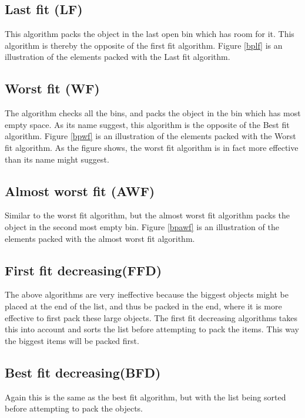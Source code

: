 \subsection{Last fit (LF)}
This algorithm packs the object in the last open bin which has room for it. This algorithm is thereby the opposite of the first fit algorithm. Figure \ref{bplf} is an illustration of the elements packed with the Last fit algorithm.


\subsection{Worst fit (WF)}
The algorithm checks all the bins, and packs the object in the bin which has most empty space. As its name suggest, this algorithm is the opposite of the Best fit algorithm. Figure \ref{bpwf} is an illustration of the elements packed with the Worst fit algorithm. As the figure shows, the worst fit algorithm is in fact more effective than its name might suggest. 

\subsection{Almost worst fit (AWF)}
Similar to the worst fit algorithm, but the almost worst fit algorithm packs the object in the second most empty bin.  Figure \ref{bpawf} is an illustration of the elements packed with the almost worst fit algorithm.

\subsection{First fit decreasing(FFD)}
The above algorithms are very ineffective because the biggest objects might be placed at the end of the list, and thus be packed in the end, where it is more effective to first pack these large objects.
The first fit decreasing algorithms takes this into account and sorts the list before attempting to pack the items. This way the biggest items will be packed first.

\subsection{Best fit decreasing(BFD)}
Again this is the same as the best fit algorithm, but with the list being sorted before attempting to pack the objects.

